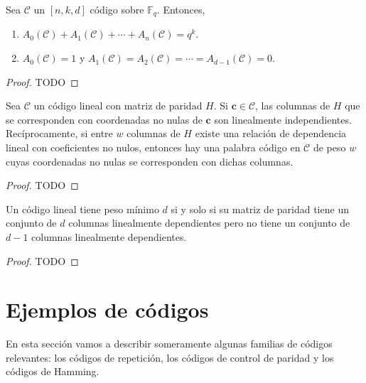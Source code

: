 \begin{theorem}
  Sea \(\mathcal C\) un \([n,k,d]\) código sobre \(\mathbb F_q\).
  Entonces, \begin{enumerate}
    \item \(A_0(\mathcal C) + A_1(\mathcal C) + \cdots + A_n(\mathcal C) = q^k\).
    \item \(A_0(\mathcal C) = 1\) y \(A_1(\mathcal C) = A_2(\mathcal C) = \cdots = A_{d-1}(\mathcal C) = 0\).
  \end{enumerate}
\end{theorem}

\begin{proof}
  TODO
\end{proof}


\begin{theorem}
  Sea \(\mathcal C\) un código lineal con matriz de paridad \(H\). Si \(\mathbf{c} \in \mathcal C\), las columnas de \(H\) que se corresponden con coordenadas no nulas de \(\mathbf{c}\) son linealmente independientes.
  Recíprocamente, si entre \(w\) columnas de \(H\) existe una relación de dependencia lineal con coeficientes no nulos, entonces hay una palabra código en \(\mathcal C\) de peso \(w\) cuyas coordenadas no nulas se corresponden con dichas columnas.
\end{theorem}

\begin{proof}
  TODO
\end{proof}

\begin{corollary}
  \label{cor:peso-minimo-columnas-dependientes}
  Un código lineal tiene peso mínimo \(d\) si y solo si su matriz de paridad tiene un conjunto de \(d\) columnas linealmente dependientes pero no tiene un conjunto de \(d-1\) columnas linealmente dependientes.
\end{corollary}

\begin{proof}
  TODO
\end{proof}

\section{Ejemplos de códigos}

En esta sección vamos a describir someramente algunas familias de códigos relevantes: los códigos de repetición, los códigos de control de paridad y los códigos de Hamming.

